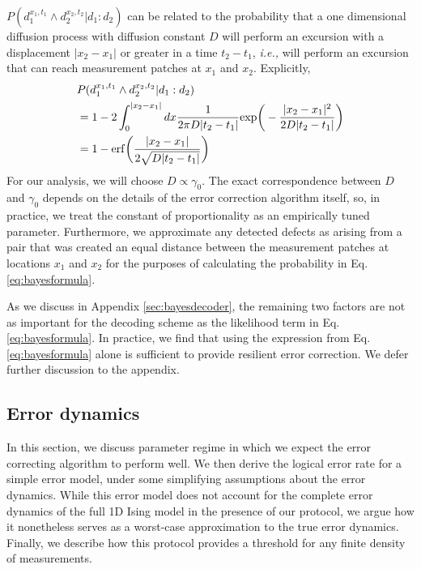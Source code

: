 \documentclass[twocolumn,superscriptaddress,aps,prb,floatfix]{revtex4-1}
\begin{document}
$P(d_1^{x_1,t_1} \wedge d_2^{x_2,t_2} | d_1:d_2)$ can be related to the probability that a one dimensional diffusion process with diffusion constant $D$ will perform an excursion with a displacement $|x_2-x_1|$ or greater in a time $t_2 - t_1$, \textit{i.e.,} will perform an excursion that can reach measurement patches at $x_1$ and $x_2$. Explicitly,
\begin{align}
\label{eq:bayesformula}
&P(d_1^{x_1,t_1} \wedge d_2^{x_2,t_2} | d_1:d_2) \\ \notag
&= 1-2\int_{0}^{|x_2-x_1|} dx \frac{1}{2\pi D |t_2-t_1|} {\rm exp}\bigg(-\frac{|x_2-x_1|^2}{2 D |t_2-t_1|}\bigg) \\ \notag 
&= 1 - {\rm erf}\bigg(\frac{|x_2-x_1|}{2\sqrt{D |t_2 - t_1|}}\bigg) 
\end{align}
For our analysis, we will choose $D\propto \gamma_0$.  The exact correspondence between $D$ and $\gamma_0$ depends on the details of the error correction algorithm itself, so, in practice, we treat the constant of proportionality as an empirically tuned parameter.  Furthermore, we approximate any detected defects as arising from a pair that was created an equal distance between the measurement patches at locations $x_1$ and $x_2$ for the purposes of calculating the probability in Eq. \ref{eq:bayesformula}.

 As we discuss in Appendix \ref{sec:bayesdecoder}, the remaining two factors are not as important for the decoding scheme as the likelihood term in Eq. \ref{eq:bayesformula}.  In practice, we find that using the expression from Eq. \ref{eq:bayesformula} alone is sufficient to provide resilient error correction.  We defer further discussion to the appendix.
 
 
 \subsection{Error dynamics}
  
  In this section, we discuss parameter regime in which we expect the error correcting algorithm to perform well.  We then derive the logical error rate for a simple error model, under some simplifying assumptions about the error dynamics.  While this error model does not account for the complete error dynamics of the full 1D Ising model in the presence of our protocol, we argue how it nonetheless serves as a worst-case approximation to the true error dynamics.  Finally, we describe how this protocol provides a threshold for any finite density of measurements.
 
\end{document}
